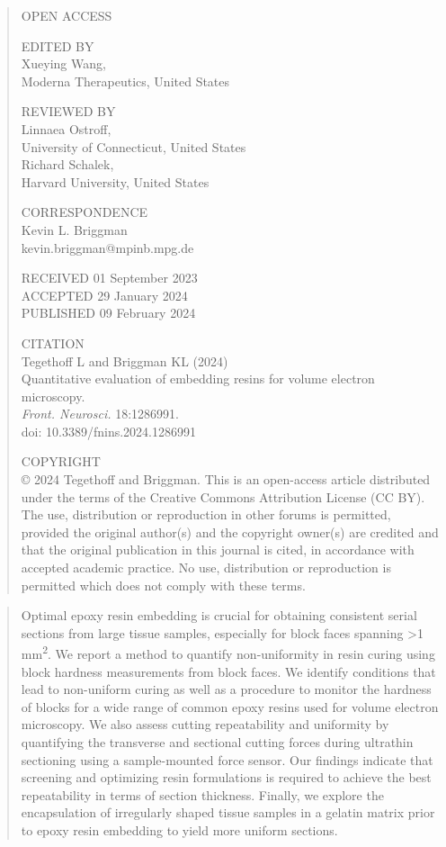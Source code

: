 \documentclass{article}
\begin{document}
\begin{quote}\small
\noindent OPEN ACCESS

\noindent EDITED BY\\
Xueying Wang,\\
Moderna Therapeutics, United States

\noindent REVIEWED BY\\
Linnaea Ostroff,\\
University of Connecticut, United States\\
Richard Schalek,\\
Harvard University, United States

\noindent *CORRESPONDENCE\\
Kevin L. Briggman\\
kevin.briggman@mpinb.mpg.de

\noindent RECEIVED 01 September 2023\\
ACCEPTED 29 January 2024\\
PUBLISHED 09 February 2024

\noindent CITATION\\
Tegethoff L and Briggman KL (2024)\\
Quantitative evaluation of embedding resins for volume electron microscopy.\\
\emph{Front. Neurosci.} 18:1286991.\\
doi: 10.3389/fnins.2024.1286991

\noindent COPYRIGHT\\
© 2024 Tegethoff and Briggman. This is an open-access article distributed under the terms of the Creative Commons Attribution License (CC BY). The use, distribution or reproduction in other forums is permitted, provided the original author(s) and the copyright owner(s) are credited and that the original publication in this journal is cited, in accordance with accepted academic practice. No use, distribution or reproduction is permitted which does not comply with these terms.
\end{quote}

\begin{quote}
Optimal epoxy resin embedding is crucial for obtaining consistent serial sections from large tissue samples, especially for block faces spanning >1 mm\textsuperscript{2}. We report a method to quantify non-uniformity in resin curing using block hardness measurements from block faces. We identify conditions that lead to non-uniform curing as well as a procedure to monitor the hardness of blocks for a wide range of common epoxy resins used for volume electron microscopy. We also assess cutting repeatability and uniformity by quantifying the transverse and sectional cutting forces during ultrathin sectioning using a sample-mounted force sensor. Our findings indicate that screening and optimizing resin formulations is required to achieve the best repeatability in terms of section thickness. Finally, we explore the encapsulation of irregularly shaped tissue samples in a gelatin matrix prior to epoxy resin embedding to yield more uniform sections.
\end{quote}
\end{document}
